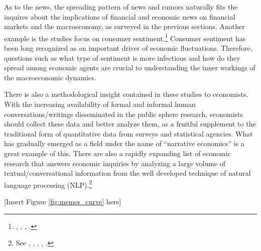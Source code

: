 	As to the news, the spreading pattern of news and rumors naturally fits the inquires about the implications of financial and economic news on financial markets and the macroeconomy, as surveyed in the previous sections.   Another example is the studies focus on consumer sentiment.\footnote{\href{https://faculty.smu.edu/millimet/classes/eco6375/papers/carroll\%20et\%20al\%201994.pdf}{\cite{carroll1994does}},
		\cite{doms2004consumer},  \href{https://onlinelibrary.wiley.com/doi/abs/10.1111/ecoj.12605}{\cite{benhabib2019sentiments}}, \cite{gorodnichenko2018social}.} Consumer sentiment has been long recognized as an important driver of economic fluctuations. Therefore, questions such as what type of sentiment is more infectious and how do they spread among economic agents are crucial to understanding the inner workings of the macroeconomic dynamics.

	There is also a methodological insight contained in these studies to economists. With the increasing availability of formal and informal human conversations/writings disseminated in the public sphere research, economists should collect these data and better analyze them, as a fruitful supplement to the traditional form of quantitative data from surveys and statistical agencies. What has gradually emerged as a field under the name of ``narrative economics'' \citep{shiller1995conversation,shiller2017narrative} is a great example of this. There are also a rapidly expanding list of economic research that answers economic inquiries by analyzing a large volume of textual/conversational information from the well developed technique of natural language processing (NLP).\footnote{See \cite{tetlock_giving_2007}, \cite{soo_quantifying_2015}, \cite{gentzkow2019text}, \cite{bybee2020structure}, \cite{ash2021text}.}

		\begin{center}
			[Insert Figure \ref{fig:memes_curve} here]
		\end{center}



